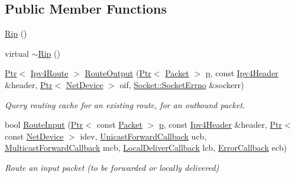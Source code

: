 \subsection*{Public Member Functions}
\begin{DoxyCompactItemize}
\item 
\hyperlink{classns3_1_1Rip_a2593bb8e6e858298059ac53ee265fe21}{Rip} ()
\item 
virtual \hyperlink{classns3_1_1Rip_a2f5e5b0f019eddaf2e38b64722552415}{$\sim$\+Rip} ()
\item 
\hyperlink{classns3_1_1Ptr}{Ptr}$<$ \hyperlink{classns3_1_1Ipv4Route}{Ipv4\+Route} $>$ \hyperlink{classns3_1_1Rip_a56d1be040d276f54ea04d5adf7c9fce6}{Route\+Output} (\hyperlink{classns3_1_1Ptr}{Ptr}$<$ \hyperlink{classns3_1_1Packet}{Packet} $>$ \hyperlink{lte__link__budget__x2__handover__measures_8m_ac9de518908a968428863f829398a4e62}{p}, const \hyperlink{classns3_1_1Ipv4Header}{Ipv4\+Header} \&header, \hyperlink{classns3_1_1Ptr}{Ptr}$<$ \hyperlink{classns3_1_1NetDevice}{Net\+Device} $>$ oif, \hyperlink{classns3_1_1Socket_ada1328c5ae0c28cb2a982caf8f6d6cca}{Socket\+::\+Socket\+Errno} \&sockerr)
\begin{DoxyCompactList}\small\item\em Query routing cache for an existing route, for an outbound packet. \end{DoxyCompactList}\item 
bool \hyperlink{classns3_1_1Rip_a4575903d3368ff77e2cc0e97c75fc8f9}{Route\+Input} (\hyperlink{classns3_1_1Ptr}{Ptr}$<$ const \hyperlink{classns3_1_1Packet}{Packet} $>$ \hyperlink{lte__link__budget__x2__handover__measures_8m_ac9de518908a968428863f829398a4e62}{p}, const \hyperlink{classns3_1_1Ipv4Header}{Ipv4\+Header} \&header, \hyperlink{classns3_1_1Ptr}{Ptr}$<$ const \hyperlink{classns3_1_1NetDevice}{Net\+Device} $>$ idev, \hyperlink{classns3_1_1Ipv4RoutingProtocol_a3453a85764cbbb1e704da7e919aa5d19}{Unicast\+Forward\+Callback} ucb, \hyperlink{classns3_1_1Ipv4RoutingProtocol_a26e76f7a555462e6c08fceda64a99d58}{Multicast\+Forward\+Callback} mcb, \hyperlink{classns3_1_1Ipv4RoutingProtocol_aa6ffa0159cb143daa3c46d2ba69bb1b9}{Local\+Deliver\+Callback} lcb, \hyperlink{classns3_1_1Ipv4RoutingProtocol_a0348285418c30d5021b08f7a68af21ea}{Error\+Callback} ecb)
\begin{DoxyCompactList}\small\item\em Route an input packet (to be forwarded or locally delivered) \end{DoxyCompactList}\item 

\end{DoxyCompactItemize}
